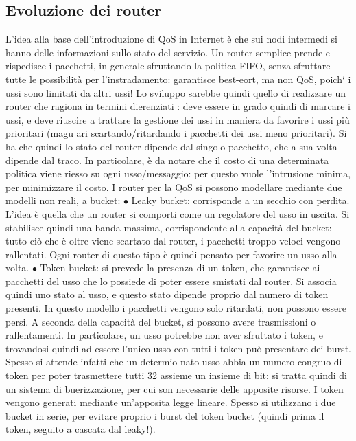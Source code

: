 \subsection{Evoluzione dei router}
L'idea alla base dell'introduzione di QoS in Internet è che sui nodi intermedi si
hanno delle informazioni sullo stato del servizio. Un router semplice prende e
rispedisce i pacchetti, in generale sfruttando la politica FIFO, senza sfruttare
tutte le possibilità per l'instradamento: garantisce best-eort, ma non QoS,
poich` i ussi sono limitati da altri ussi!
Lo sviluppo sarebbe quindi quello di realizzare un router che ragiona in termini dierenziati : deve essere in grado
quindi di marcare i ussi, e deve riuscire
a trattare la gestione dei ussi in maniera da favorire i ussi più prioritari (magu
ari scartando/ritardando i pacchetti dei ussi meno prioritari). Si ha che quindi
lo stato del router dipende dal singolo pacchetto, che a sua volta dipende dal
traco. In particolare, è da notare che il costo di una determinata politica
viene riesso su ogni usso/messaggio: per questo vuole l'intrusione minima,
per minimizzare il costo.
I router per la QoS si possono modellare mediante due modelli non reali, a
bucket:
$\bullet$ Leaky bucket: corrisponde a un secchio con perdita. L'idea è quella che
un router si comporti come un regolatore del usso in uscita. Si stabilisce
quindi una banda massima, corrispondente alla capacità del bucket: tutto
ciò che è oltre viene scartato dal router, i pacchetti troppo veloci vengono
rallentati. Ogni router di questo tipo è quindi pensato per favorire un
usso alla volta.
$\bullet$ Token bucket: si prevede la presenza di un token, che garantisce ai pacchetti del usso che lo possiede di
poter essere smistati dal router. Si associa
quindi uno stato al usso, e questo stato dipende proprio dal numero di
token presenti. In questo modello i pacchetti vengono solo ritardati, non
possono essere persi. A seconda della capacità del bucket, si possono avere
trasmissioni o rallentamenti. In particolare, un usso potrebbe non aver
sfruttato i token, e trovandosi quindi ad essere l'unico usso con tutti i
token può presentare dei burst. Spesso si attende infatti che un determio
nato usso abbia un numero congruo di token per poter trasmettere tutti
32
assieme un insieme di bit; si tratta quindi di un sistema di buerizzazione,
per cui son necessarie delle apposite risorse. I token vengono generati
mediante un'apposita legge lineare.
Spesso si utilizzano i due bucket in serie, per evitare proprio i burst del token
bucket (quindi prima il token, seguito a cascata dal leaky!).
